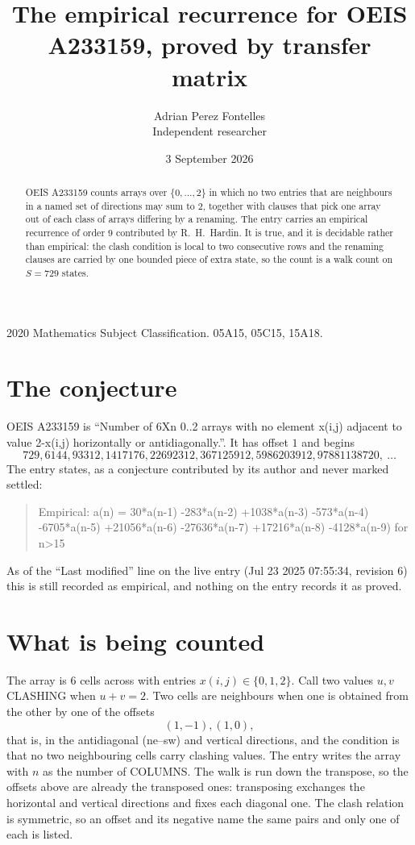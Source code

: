 \documentclass[11pt,a4paper]{article}
\title{The empirical recurrence for OEIS A233159, proved by transfer matrix}
\author{Adrian Perez Fontelles\\ \small Independent researcher}
\date{3 September 2026}
\theoremstyle{plain}
\theoremstyle{definition}
\begin{document}
\maketitle

\begin{abstract}
OEIS A233159 counts arrays over $\{0,\dots,2\}$ in which no two entries that are neighbours in
a named set of directions may sum to $2$, together with clauses that pick one array out of
each class of arrays differing by a renaming. The entry carries an empirical recurrence of
order $9$ contributed by R.~H.~Hardin. It is true, and it is decidable rather than
empirical: the clash condition is local to two consecutive rows and the renaming clauses are
carried by one bounded piece of extra state, so the count is a walk count on $S=729$ states.
\end{abstract}

\noindent\small 2020 Mathematics Subject Classification. 05A15, 05C15, 15A18.\normalsize

\section{The conjecture}

OEIS A233159 is ``Number of 6Xn 0..2 arrays with no element x(i,j) adjacent to value 2-x(i,j) horizontally or antidiagonally.''. It has offset $1$ and begins
\[
729, 6144, 93312, 1417176, 22692312, 367125912, 5986203912, 97881138720,\ \dots
\]
The entry states, as a conjecture contributed by its author and never marked settled:
\begin{quote}
Empirical: a(n) = 30*a(n-1) -283*a(n-2) +1038*a(n-3) -573*a(n-4) -6705*a(n-5) +21056*a(n-6) -27636*a(n-7) +17216*a(n-8) -4128*a(n-9) for n>15
\end{quote}
As of the ``Last modified'' line on the live entry (Jul 23 2025 07:55:34, revision 6) this is still
recorded as empirical, and nothing on the entry records it as proved.

\section{What is being counted}

The array is $6$ cells across with entries $x(i,j)\in\{0,1,2\}$. Call two values $u,v$ CLASHING
when $u+v=2$. Two cells are neighbours when one is obtained from the other by one of
the offsets
\[
(1,-1), (1,0),
\]
that is, in the antidiagonal (ne--sw) and vertical directions, and the condition is that no two neighbouring cells carry
clashing values. The entry writes the array with $n$ as the number of COLUMNS. The walk is run down the transpose, so the offsets above are already the transposed ones: transposing exchanges the horizontal and vertical directions and fixes each diagonal one. The clash relation is symmetric, so an offset and its negative name the
same pairs and only one of each is listed.
\end{document}
